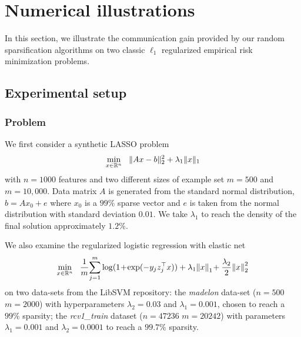 \section{Numerical illustrations}\label{sec:spy_exps}

In this section, we illustrate the communication gain provided by our random sparsification algorithms on two classic $\ell_1$ regularized empirical risk minimization problems.

\subsection{Experimental setup}
\subsubsection{Problem}
We first consider a synthetic LASSO problem
\begin{equation}\label{eq:lasso}
\min_{x\in \mathbb{R}^n} ~~\| Ax - b\|^2_2 + \lambda_1 \|x \|_1
\end{equation}
with $n=1000$ features and two different sizes of example set $m= 500$ and $m = 10,000$. Data matrix $A$ is generated from the standard normal distribution, $b = Ax_0 +e$ where $x_0$ is a $99\%$ sparse vector and $e$ is taken from the normal distribution with standard deviation $0.01$.  
We take $\lambda_1$ to reach the density of the final solution approximately $1.2\%$.

We also examine the regularized logistic regression with elastic net
\begin{equation}\label{eq:logistic2}
\min_{x\in \mathbb{R}^n}~~\frac{1}{m}\!\sum_{j=1}^m \log(1 \!+\! \exp(-y_j z_j^{\top} x)) + \lambda_1\!\left\|x\right\|_1 \!+ \frac{\lambda_2}{2}\!\left\|x\right\|_2^2
\end{equation}
on two data-sets from the LibSVM repository: the 
\emph{madelon} data-set ($n=500$ $m=2000$) 
with hyperparameters $\lambda_2 = 0.03$ and $\lambda_1 = 0.001$, chosen to reach a $99\%$ sparsity;
the \emph{rcv1\_train} dataset ($n=47236$ $m=20242$) with parameters $\lambda_1 = 0.001$ and $\lambda_2  = 0.0001$ to reach a $99.7\%$ sparsity.


